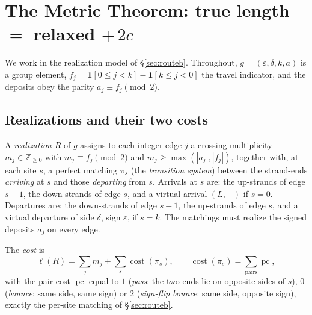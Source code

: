 
\section{The Metric Theorem: true length \texorpdfstring{$=$}{=} relaxed \texorpdfstring{$+\,2c$}{+2c}}
\label{sec:metric}

We work in the realization model of \S\ref{sec:routeb}. Throughout, $g=(\varepsilon,\delta,k,a)$
is a group element, $f_j=\mathbf 1[0\le j<k]-\mathbf 1[k\le j<0]$ the travel indicator, and the
deposits obey the parity $a_j\equiv f_j\pmod 2$.

\subsection{Realizations and their two costs}

\begin{definition}[Realization]\label{def:realization}
A \emph{realization} $R$ of $g$ assigns to each integer edge $j$ a crossing multiplicity
$m_j\in\mathbb Z_{\ge0}$ with $m_j\equiv f_j\pmod2$ and $m_j\ge\max(|a_j|,|f_j|)$, together with,
at each site $s$, a perfect matching $\pi_s$ (the \emph{transition system}) between the strand-ends
\emph{arriving} at $s$ and those \emph{departing} from $s$. Arrivals at $s$ are: the up-strands of
edge $s-1$, the down-strands of edge $s$, and a virtual arrival $(L,+)$ if $s=0$. Departures are: the
down-strands of edge $s-1$, the up-strands of edge $s$, and a virtual departure of side $\delta$,
sign $\varepsilon$, if $s=k$. The matchings must realize the signed deposits $a_j$ on every edge.

The \emph{cost} is
\[
   \ell(R)=\sum_j m_j+\sum_s\operatorname{cost}(\pi_s),\qquad
   \operatorname{cost}(\pi_s)=\sum_{\text{pairs}}\operatorname{pc},
\]
with the pair cost $\operatorname{pc}$ equal to $1$ (\emph{pass}: the two ends lie on opposite sides
of $s$), $0$ (\emph{bounce}: same side, same sign) or $2$ (\emph{sign-flip bounce}: same side,
opposite sign), exactly the per-site matching of \S\ref{sec:routeb}.
\end{definition}

